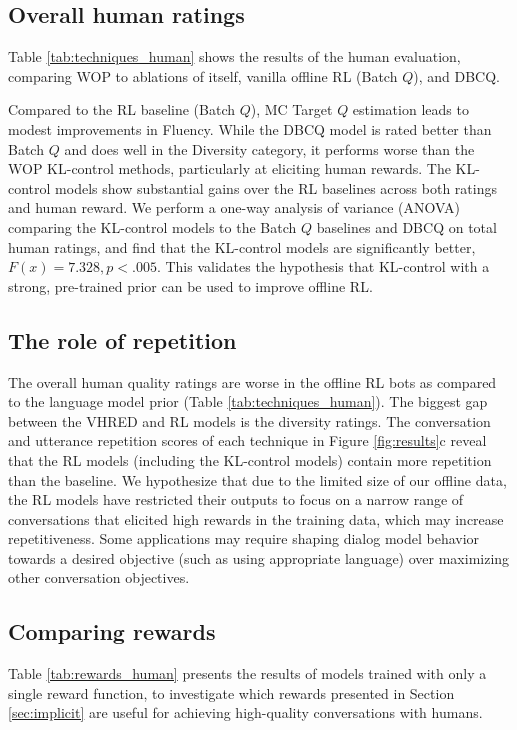\subsection{Overall human ratings} Table \ref{tab:techniques_human} shows the results of the human evaluation, comparing WOP to ablations of itself, vanilla offline RL (Batch $Q$), and DBCQ. 

Compared to the RL baseline (Batch $Q$), MC Target $Q$ estimation leads to modest improvements in Fluency. While the DBCQ model is rated better than Batch $Q$ and does well in the Diversity category, it performs worse than the WOP KL-control methods, particularly at eliciting human rewards. The KL-control models show substantial gains over the RL baselines across both ratings and human reward. We perform a one-way analysis of variance (ANOVA) comparing the KL-control models to the Batch $Q$ baselines and DBCQ on total human ratings, and find that the KL-control models are significantly better, $F(x) =  7.328, p <.005$. This validates the hypothesis that KL-control with a strong, pre-trained prior can be used to improve offline RL. 

\subsection{The role of repetition} The overall human quality ratings are worse in the offline RL bots as compared to the language model prior (Table \ref{tab:techniques_human}). The biggest gap between the VHRED and RL models is the diversity ratings. The conversation and utterance repetition scores of each technique in Figure \ref{fig:results}c reveal that the RL models (including the KL-control models) contain more repetition than the baseline. We hypothesize that due to the limited size of our offline data, the RL models have restricted their outputs to focus on a narrow range of conversations that elicited high rewards in the training data, which may increase repetitiveness. Some applications may require shaping dialog model behavior towards a desired objective (such as using appropriate language) over maximizing other conversation objectives.

\subsection{Comparing rewards} Table \ref{tab:rewards_human} presents the results of models trained with only a single reward function, to investigate which rewards presented in Section \ref{sec:implicit} are useful for achieving high-quality conversations with humans. 

